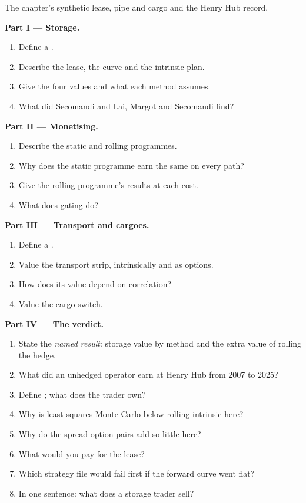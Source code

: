 \begin{problem}\label{pb:s2:storage-transport-and-physical-optionality:1}
The chapter's synthetic lease, pipe and cargo and the Henry Hub record.

\medskip\noindent\textbf{Part I --- Storage.}
\begin{enumerate}
\item Define a .
\item Describe the lease, the curve and the intrinsic plan.
\item Give the four values and what each method assumes.
\item What did Secomandi and Lai, Margot and Secomandi find?
\end{enumerate}

\medskip\noindent\textbf{Part II --- Monetising.}
\begin{enumerate}[resume]
\item Describe the static and rolling programmes.
\item Why does the static programme earn the same on every path?
\item Give the rolling programme's results at each cost.
\item What does gating do?
\end{enumerate}

\medskip\noindent\textbf{Part III --- Transport and cargoes.}
\begin{enumerate}[resume]
\item Define a .
\item Value the transport strip, intrinsically and as options.
\item How does its value depend on correlation?
\item Value the cargo switch.
\end{enumerate}

\medskip\noindent\textbf{Part IV --- The verdict.}
\begin{enumerate}[resume]
\item State the \emph{named result}: storage value by method and the extra value of rolling the hedge.
\item What did an unhedged operator earn at Henry Hub from 2007 to 2025?
\item Define ; what does the trader own?
\item Why is least-squares Monte Carlo below rolling intrinsic here?
\item Why do the spread-option pairs add so little here?
\item What would you pay for the lease?
\item Which strategy file would fail first if the forward curve went flat?
\item In one sentence: what does a storage trader sell?
\end{enumerate}
\end{problem}

